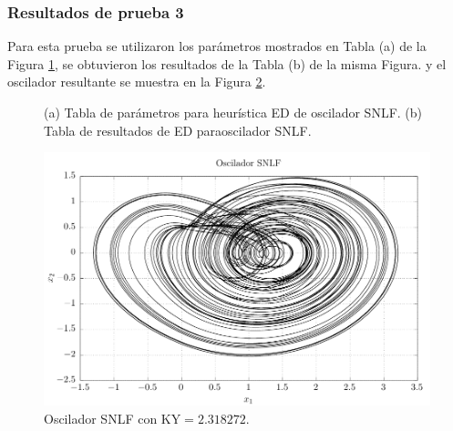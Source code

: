\documentclass[10pt,a4paper]{article}
\begin{document}
\subsubsection{Resultados de prueba 3}
Para esta prueba se utilizaron los parámetros mostrados en Tabla (a) de la Figura \ref{fig:tabs_res3}, se obtuvieron los resultados de la Tabla (b) de la misma Figura. y el oscilador resultante se muestra en la Figura \ref{fig:res3}.
\begin{figure}[htp]
	\centering
	\hspace{2cm}
	\caption{(a) Tabla de parámetros para heurística ED de oscilador SNLF. (b) Tabla de resultados de ED paraoscilador SNLF.}
	\label{fig:tabs_res3}
\end{figure}

\begin{figure}[htp]
	\centering
	\includegraphics[width=.5\textwidth]{imagenes/super3.pdf}
	\caption{Oscilador SNLF con KY$ = 2.318272$.}
	\label{fig:res3}
\end{figure}
\end{document}
